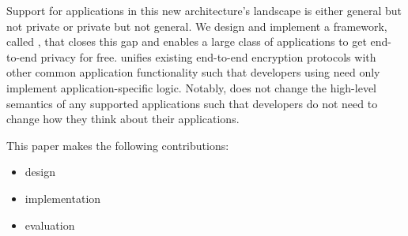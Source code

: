 Support for applications in this new architecture's landscape is either 
general but not private or private but not general. We design and implement
a framework, called \name, that closes this gap and enables a large class of
applications to get end-to-end privacy for free. \name unifies existing
end-to-end encryption protocols \cite{signal} with other common 
application functionality such that developers using \name need only implement 
application-specific logic. Notably, \name does not change the high-level 
semantics of any supported applications such that developers do not need to 
change how they think about their applications.

This paper makes the following contributions: 
\begin{itemize}
\item \name design
\item \name implementation
\item \name evaluation
\end{itemize}
